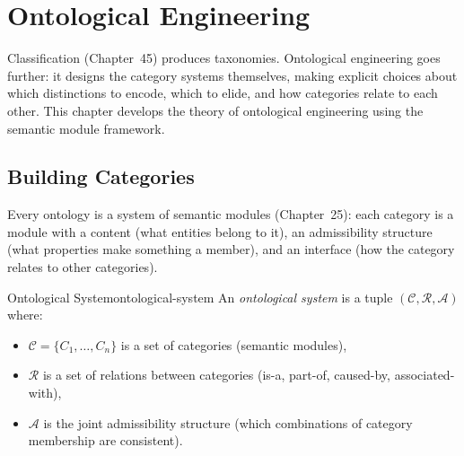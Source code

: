 \chapter{Ontological Engineering}



Classification (Chapter~45) produces taxonomies. Ontological engineering
goes further: it designs the category systems themselves, making explicit
choices about which distinctions to encode, which to elide, and how
categories relate to each other. This chapter develops the theory of
ontological engineering using the semantic module framework.

\section{Building Categories}

Every ontology is a system of semantic modules (Chapter~25): each category
is a module with a content (what entities belong to it), an admissibility
structure (what properties make something a member), and an interface
(how the category relates to other categories).

\begin{definition}{Ontological System}{ontological-system}
  An \emph{ontological system} is a tuple $(\mathcal{C}, \mathcal{R},
  \mathcal{A})$ where:
  \begin{itemize}
    \item $\mathcal{C} = \{C_1, \ldots, C_n\}$ is a set of categories
          (semantic modules),
    \item $\mathcal{R}$ is a set of relations between categories
          (is-a, part-of, caused-by, associated-with),
    \item $\mathcal{A}$ is the joint admissibility structure
          (which combinations of category membership are consistent).
  \end{itemize}
\end{definition}

